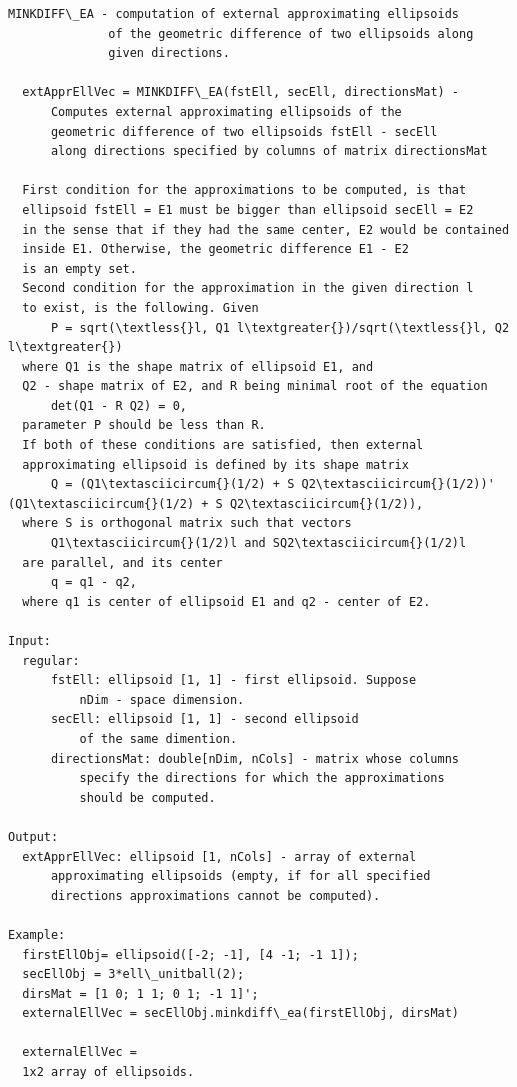 \documentclass[letterpaper,10pt,english]{sphinxmanual}
\begin{document}
\begin{Verbatim}[commandchars=\\\{\}]
MINKDIFF\_EA - computation of external approximating ellipsoids
              of the geometric difference of two ellipsoids along
              given directions.

  extApprEllVec = MINKDIFF\_EA(fstEll, secEll, directionsMat) -
      Computes external approximating ellipsoids of the
      geometric difference of two ellipsoids fstEll - secEll
      along directions specified by columns of matrix directionsMat

  First condition for the approximations to be computed, is that
  ellipsoid fstEll = E1 must be bigger than ellipsoid secEll = E2
  in the sense that if they had the same center, E2 would be contained
  inside E1. Otherwise, the geometric difference E1 - E2
  is an empty set.
  Second condition for the approximation in the given direction l
  to exist, is the following. Given
      P = sqrt(\textless{}l, Q1 l\textgreater{})/sqrt(\textless{}l, Q2 l\textgreater{})
  where Q1 is the shape matrix of ellipsoid E1, and
  Q2 - shape matrix of E2, and R being minimal root of the equation
      det(Q1 - R Q2) = 0,
  parameter P should be less than R.
  If both of these conditions are satisfied, then external
  approximating ellipsoid is defined by its shape matrix
      Q = (Q1\textasciicircum{}(1/2) + S Q2\textasciicircum{}(1/2))' (Q1\textasciicircum{}(1/2) + S Q2\textasciicircum{}(1/2)),
  where S is orthogonal matrix such that vectors
      Q1\textasciicircum{}(1/2)l and SQ2\textasciicircum{}(1/2)l
  are parallel, and its center
      q = q1 - q2,
  where q1 is center of ellipsoid E1 and q2 - center of E2.

Input:
  regular:
      fstEll: ellipsoid [1, 1] - first ellipsoid. Suppose
          nDim - space dimension.
      secEll: ellipsoid [1, 1] - second ellipsoid
          of the same dimention.
      directionsMat: double[nDim, nCols] - matrix whose columns
          specify the directions for which the approximations
          should be computed.

Output:
  extApprEllVec: ellipsoid [1, nCols] - array of external
      approximating ellipsoids (empty, if for all specified
      directions approximations cannot be computed).

Example:
  firstEllObj= ellipsoid([-2; -1], [4 -1; -1 1]);
  secEllObj = 3*ell\_unitball(2);
  dirsMat = [1 0; 1 1; 0 1; -1 1]';
  externalEllVec = secEllObj.minkdiff\_ea(firstEllObj, dirsMat)

  externalEllVec =
  1x2 array of ellipsoids.
\end{Verbatim}
\end{document}
